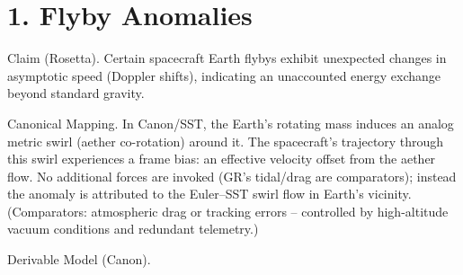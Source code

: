 \documentclass[11pt]{article}
\begin{document}
\section*{1. Flyby Anomalies}

Claim (Rosetta). Certain spacecraft Earth flybys exhibit unexpected changes in asymptotic speed (Doppler shifts), indicating an unaccounted energy exchange beyond standard gravity.


Canonical Mapping. In Canon/SST, the Earth’s rotating mass induces an analog metric swirl (aether co-rotation) around it. The spacecraft’s trajectory through this swirl experiences a frame bias: an effective velocity offset from the aether flow. No additional forces are invoked (GR’s tidal/drag are comparators); instead the anomaly is attributed to the Euler–SST swirl flow in Earth’s vicinity. (Comparators: atmospheric drag or tracking errors – controlled by high-altitude vacuum conditions and redundant telemetry.)


Derivable Model (Canon).
\end{document}
